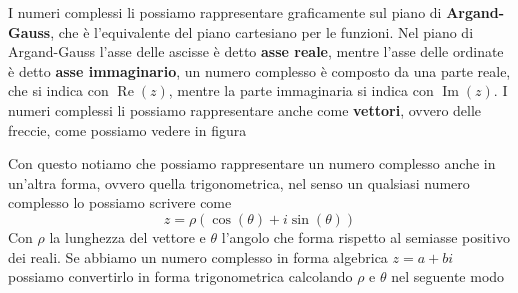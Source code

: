 \documentclass{rapport}
\begin{document}
I numeri complessi li possiamo rappresentare graficamente sul piano di \textbf{Argand-Gauss}, che è l'equivalente del piano cartesiano per le funzioni. Nel piano di Argand-Gauss l'asse delle ascisse è detto \textbf{asse reale}, mentre l'asse delle ordinate è detto \textbf{asse immaginario}, un numero complesso è composto da una parte reale, che si indica con $\operatorname{Re}(z)$, mentre la parte immaginaria si indica con $\operatorname{Im}(z)$. I numeri complessi li possiamo rappresentare anche come \textbf{vettori}, ovvero delle freccie, come possiamo vedere in figura

\begin{center}
\end{center}

Con questo notiamo che possiamo rappresentare un numero complesso anche in un'altra forma, ovvero quella trigonometrica, nel senso un qualsiasi numero complesso lo possiamo scrivere come 
\[
z = \rho (\cos(\theta) + i \sin(\theta))
\]
Con $\rho$ la lunghezza del vettore e $\theta$ l'angolo che forma rispetto al semiasse positivo dei reali. Se abbiamo un numero complesso in forma algebrica $z=a+bi$ possiamo convertirlo in forma trigonometrica calcolando $\rho$ e $\theta$ nel seguente modo
\end{document}
